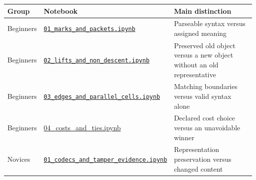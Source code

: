 \documentclass[
  11pt,
]{article}
\begin{document}
\begin{longtable}[]{@{}
  >{\raggedright\arraybackslash}p{}
  >{\raggedright\arraybackslash}p{}
  >{\raggedright\arraybackslash}p{}@{}}
\toprule\noalign{}
\begin{minipage}[b]{\linewidth}\raggedright
Group
\end{minipage} & \begin{minipage}[b]{\linewidth}\raggedright
Notebook
\end{minipage} & \begin{minipage}[b]{\linewidth}\raggedright
Main distinction
\end{minipage} \\
\midrule\noalign{}
\endhead
\bottomrule\noalign{}
\endlastfoot
Beginners &
\href{https://github.com/dbccpage/the_symbol_game/blob/52cb5457f6c485ba548cfd292f6012a941ed22cf/education/the_symbol_game/lessons/system_integration/000_beginners/01_marks_and_packets.ipynb}{\nolinkurl{01_marks_and_packets.ipynb}}
& Parseable syntax versus assigned meaning \\
Beginners &
\href{https://github.com/dbccpage/the_symbol_game/blob/52cb5457f6c485ba548cfd292f6012a941ed22cf/education/the_symbol_game/lessons/system_integration/000_beginners/02_lifts_and_non_descent.ipynb}{\nolinkurl{02_lifts_and_non_descent.ipynb}}
& Preserved old object versus a new object without an old
representative \\
Beginners &
\href{https://github.com/dbccpage/the_symbol_game/blob/52cb5457f6c485ba548cfd292f6012a941ed22cf/education/the_symbol_game/lessons/system_integration/000_beginners/03_edges_and_parallel_cells.ipynb}{\nolinkurl{03_edges_and_parallel_cells.ipynb}}
& Matching boundaries versus valid syntax alone \\
Beginners &
\href{https://github.com/dbccpage/the_symbol_game/blob/52cb5457f6c485ba548cfd292f6012a941ed22cf/education/the_symbol_game/lessons/system_integration/000_beginners/04_costs_and_ties.ipynb}{04\_costs\_and\_ties.ipynb}
& Declared cost choice versus an unavoidable winner \\
Novices &
\href{https://github.com/dbccpage/the_symbol_game/blob/52cb5457f6c485ba548cfd292f6012a941ed22cf/education/the_symbol_game/lessons/system_integration/100_novices/01_codecs_and_tamper_evidence.ipynb}{\nolinkurl{01_codecs_and_tamper_evidence.ipynb}}
& Representation preservation versus changed content \\

\end{longtable}
\end{document}
